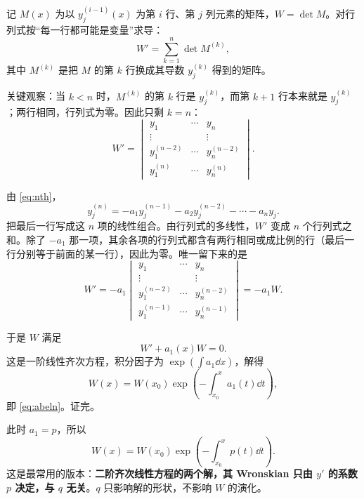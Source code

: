 \documentclass[11pt]{ctexart}
\let\origsubhdr\subhdr
\renewcommand{\subhdr}[1]{\needspace{3\baselineskip}\origsubhdr{#1}}
\begin{document}

记 $M(x)$ 为以 $y_j^{(i-1)}(x)$ 为第 $i$ 行、第 $j$ 列元素的矩阵，$W=\det M$。对行列式按“每一行都可能是变量”求导：
\[
W'=\sum_{k=1}^{n}\det M^{(k)},
\]
其中 $M^{(k)}$ 是把 $M$ 的第 $k$ 行换成其导数 $y_j^{(k)}$ 得到的矩阵。

关键观察：当 $k<n$ 时，$M^{(k)}$ 的第 $k$ 行是 $y_j^{(k)}$，而第 $k+1$ 行本来就是 $y_j^{(k)}$；两行相同，行列式为零。因此只剩 $k=n$：
\[
W'=
\begin{vmatrix}
y_1&\cdots&y_n\\
\vdots&&\vdots\\
y_1^{(n-2)}&\cdots&y_n^{(n-2)}\\
y_1^{(n)}&\cdots&y_n^{(n)}
\end{vmatrix}.
\]


由 \eqref{eq:nth}，
\[
y_j^{(n)}=-a_1y_j^{(n-1)}-a_2y_j^{(n-2)}-\cdots-a_ny_j.
\]
把最后一行写成这 $n$ 项的线性组合。由行列式的多线性，$W'$ 变成 $n$ 个行列式之和。除了 $-a_1$ 那一项，其余各项的行列式都含有两行相同或成比例的行（最后一行分别等于前面的某一行），因此为零。唯一留下来的是
\[
W'=-a_1
\begin{vmatrix}
y_1&\cdots&y_n\\
\vdots&&\vdots\\
y_1^{(n-2)}&\cdots&y_n^{(n-2)}\\
y_1^{(n-1)}&\cdots&y_n^{(n-1)}
\end{vmatrix}
=-a_1W.
\]


于是 $W$ 满足
\[
W'+a_1(x)W=0.
\]
这是一阶线性齐次方程，积分因子为 $\exp(\int a_1\dd x)$，解得
\[
W(x)=W(x_0)\exp\!\left(-\int_{x_0}^{x}a_1(t)\dd t\right),
\]
即 \eqref{eq:abeln}。证完。



此时 $a_1=p$，所以
\[
W(x)=W(x_0)\exp\!\left(-\int_{x_0}^{x}p(t)\dd t\right).
\]
这是最常用的版本：\textbf{二阶齐次线性方程的两个解，其 Wronskian 只由 $y'$ 的系数 $p$ 决定，与 $q$ 无关}。$q$ 只影响解的形状，不影响 $W$ 的演化。

\end{document}

